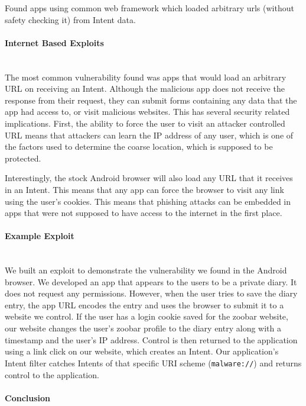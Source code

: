 \documentclass[12pt,a4paper]{article}
\begin{document}
Found apps using common web framework which loaded arbitrary urls (without
safety checking it) from Intent data.

\paragraph{Internet Based Exploits} ~\\
The most common vulnerability found was apps that would load an arbitrary URL on
receiving an Intent. Although the malicious app does not receive the response
from their request, they can submit forms containing any data that the app had
access to, or visit malicious websites. This has several security related
implications. First, the ability to force the user to visit an attacker
controlled URL means that attackers can learn the IP address of any user, which
is one of the factors used to determine the coarse location, which is supposed
to be protected.

Interestingly, the stock Android browser will also load any URL that it receives
in an Intent. This means that any app can force the browser to visit any link
using the user's cookies. This means that phishing attacks can be embedded in
apps that were not supposed to have access to the internet in the first place.

\paragraph{Example Exploit} ~\\
We built an exploit to demonstrate the vulnerability we found in the Android
browser. We developed an app that appears to the users to be a private diary. It
does not request any permissions. However, when the user tries to save the diary
entry, the app URL encodes the entry and uses the browser to submit it to a
website we control. If the user has a login cookie saved for the zoobar website,
our website changes the user's zoobar profile to the diary entry along with a
timestamp and the user's IP address. Control is then returned to the application
using a link click on our website, which creates an Intent. Our application's
Intent filter catches Intents of that specific URI scheme (\texttt{malware://})
and returns control to the application.

\paragraph{Conclusion} ~\\
 
\end{document}
